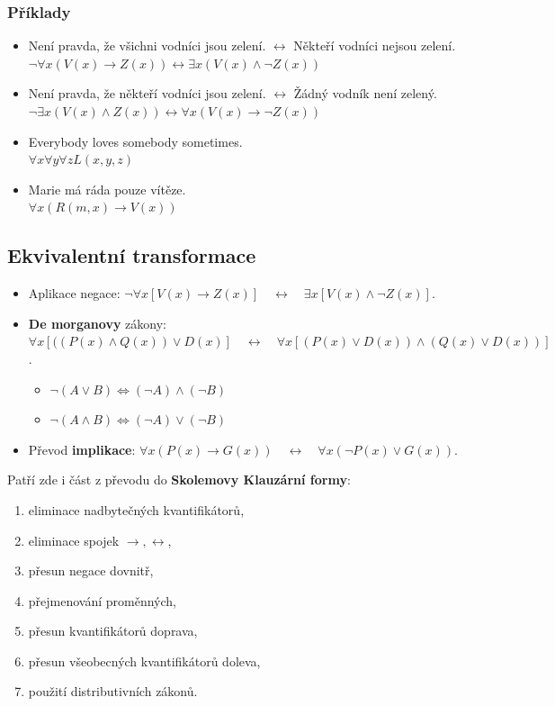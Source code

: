 \subsubsection*{Příklady}
\begin{itemize}
\item Není pravda, že všichni vodníci jsou zelení. $ \leftrightarrow $ Někteří vodníci nejsou zelení.\\$\neg{}\forall{}x (V(x) \rightarrow Z(x)) \leftrightarrow \exists{}x (V(x) \land \neg{}Z(x))$
\item Není pravda, že někteří vodníci jsou zelení. $ \leftrightarrow $ Žádný vodník není zelený.\\
$\neg{}\exists{}x (V(x) \land Z(x)) \leftrightarrow \forall{}x (V(x) \rightarrow \neg{}Z(x))$
\item Everybody loves somebody sometimes.\\
$\forall{}x \forall{}y \forall{}z L(x,y,z)$
\item Marie má ráda pouze vítěze.\\
$\forall{}x (R(m,x) \rightarrow V(x))$
\end{itemize}

\subsection{Ekvivalentní transformace}
\begin{itemize}
	\item Aplikace negace: $\neg{}\forall{}x [V(x) \rightarrow{} Z(x)] \quad \leftrightarrow \quad \exists{}x [V(x) \land{} \neg{}Z(x)]$.
	\item \textbf{De morganovy} zákony: $\forall{}x [((P(x) \land{}Q(x)) \lor{}D(x)] \quad \leftrightarrow \quad \forall{}x [(P(x) \lor{}D(x)) \land{}(Q(x) \lor{}D(x))]$.
	\begin{itemize}
		\item[] $\neg (A\vee B)\iff (\neg A)\wedge (\neg B)$
		\item[] $\neg (A\wedge B)\iff (\neg A)\vee (\neg B)$
	\end{itemize}
	\item Převod \textbf{implikace}: $\forall{}x (P(x) \rightarrow{}G(x)) \quad \leftrightarrow \quad \forall{}x (\neg{}P(x)\lor{}G(x))$.
\end{itemize}

\noindent Patří zde i část z převodu do \textbf{Skolemovy Klauzární formy}:
\begin{enumerate}
\item eliminace nadbytečných kvantifikátorů,
\item eliminace spojek $\rightarrow, \leftrightarrow$,
\item přesun negace dovnitř,
\item přejmenování proměnných,
\item přesun kvantifikátorů doprava,
\item přesun všeobecných kvantifikátorů doleva,
\item použití distributivních zákonů.
\end{enumerate}

